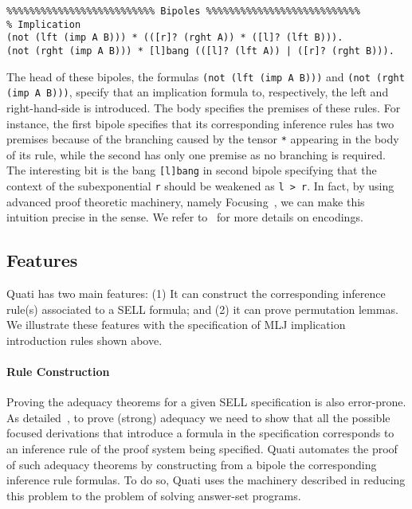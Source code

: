\documentclass{llncs}
\begin{document}
{\small
\begin{verbatim}
%%%%%%%%%%%%%%%%%%%%%%%%%% Bipoles %%%%%%%%%%%%%%%%%%%%%%%%%%%
% Implication
(not (lft (imp A B))) * (([r]? (rght A)) * ([l]? (lft B))).
(not (rght (imp A B))) * [l]bang (([l]? (lft A)) | ([r]? (rght B))).
\end{verbatim}
}

The head of these bipoles, the formulas \texttt{(not (lft (imp A B)))} and
\texttt{(not (rght (imp A B)))}, specify that an implication formula to, respectively, 
the left and right-hand-side is introduced. The body specifies the premises of these
rules. For instance, the first bipole specifies that its corresponding inference rules
has two premises because of the branching caused by the  
tensor \texttt{*} appearing in the body of its rule, while
the second has only one premise as no branching is required. 
The interesting bit is the bang \texttt{[l]bang} in second bipole specifying that the 
context of the subexponential \texttt{r} should be weakened as \texttt{l > r}.
In fact, by using advanced proof theoretic machinery, namely Focusing~\cite{andreoli92jlc}, 
we can make this intuition precise in the sense. We refer to~\cite{nigam.jlc} for more details
on encodings.


\subsection{Features}

Quati has two main features: (1) It can construct the corresponding inference rule(s) associated
to a SELL formula; and (2) it can prove permutation lemmas. We illustrate these features with 
the specification of MLJ implication introduction rules shown above.

\vspace{-2mm}

\paragraph{Rule Construction} Proving the adequacy theorems for a given SELL specification is also 
error-prone. As detailed~\cite{nigam.jlc}, to prove (strong) adequacy we need to show that all 
the possible focused derivations that introduce a formula in the specification corresponds to 
an inference rule of the proof system being specified. Quati automates the proof of such 
adequacy theorems by constructing from a bipole the corresponding inference rule formulas. 
To do so, Quati uses the machinery described in \cite{nigam13iclp,nigam14ebl} reducing
this problem to the problem of solving answer-set programs. 
\end{document}
